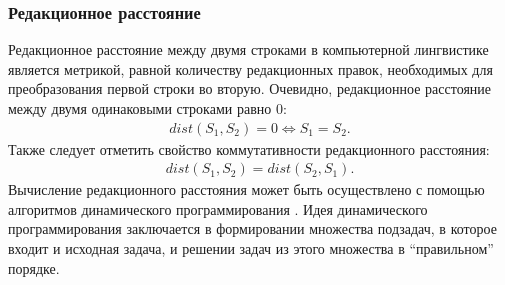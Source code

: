 \subsubsection{Редакционное расстояние}
Редакционное расстояние между двумя строками в компьютерной лингвистике является метрикой, равной количеству редакционных правок, необходимых для преобразования первой строки во вторую. Очевидно, редакционное расстояние между двумя одинаковыми строками равно \(0\):
\begin{align}
	dist(S_1, S_2) = 0 \Leftrightarrow S_1 = S_2\text{.}
\end{align}
Также следует отметить свойство коммутативности редакционного расстояния:
\begin{align}
	dist(S_1, S_2) = dist(S_2, S_1)\text{.}
\end{align}
Вычисление редакционного расстояния может быть осуществлено с помощью алгоритмов динамического программирования \cite{dasgupta}. Идея динамического программирования заключается в формировании множества подзадач, в которое входит и исходная задача, и решении задач из этого множества в ``правильном'' порядке. 

